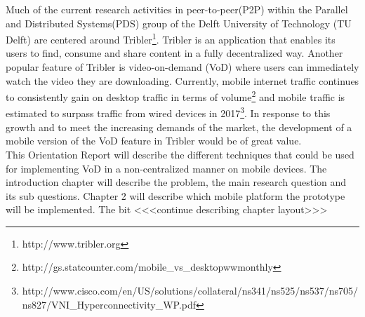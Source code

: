 Much of the current research activities in peer-to-peer(P2P) within the Parallel and Distributed Systems(PDS) group of the Delft University of Technology (TU Delft) are centered around Tribler\footnote{http://www.tribler.org}. Tribler is an application that enables its users to find, consume and share content in a fully decentralized way. Another popular feature of Tribler is video-on-demand (VoD) where users can immediately watch the video they are downloading. Currently, mobile internet traffic continues to consistently gain on desktop traffic in terms of volume\footnote{http://gs.statcounter.com/mobile\_vs\_desktop\-ww\-monthly} and mobile traffic is estimated to surpass traffic from wired devices in 2017\footnote{http://www.cisco.com/en/US/solutions/collateral/ns341/ns525/ns537/ns705/ns827/VNI\_Hyperconnectivity\_WP.pdf}. In response to this growth and to meet the increasing demands of the market, the development of a mobile version of the VoD feature in Tribler would be of great value.\\
This Orientation Report will describe the different techniques that could be used for implementing VoD in a non-centralized manner on mobile devices. The introduction chapter will describe the problem, the main research question and its sub questions. Chapter 2 will describe which mobile platform the prototype will be implemented. The bit <<<continue describing chapter layout>>>  
